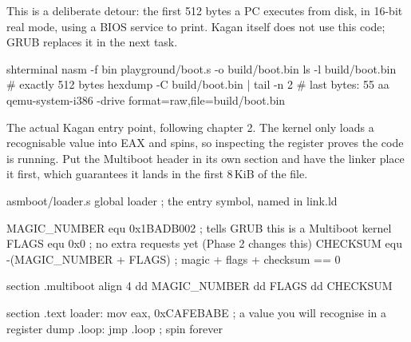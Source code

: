 \documentclass[11pt,a4paper]{article}
\begin{document}
This is a deliberate detour: the first 512 bytes a PC executes from disk, in 16-bit real mode, using a BIOS
service to print. Kagan itself does not use this code; GRUB replaces it in the next task.


\begin{lst}{sh}{terminal}
nasm -f bin playground/boot.s -o build/boot.bin
ls -l build/boot.bin             # exactly 512 bytes
hexdump -C build/boot.bin | tail -n 2   # last bytes: 55 aa
qemu-system-i386 -drive format=raw,file=build/boot.bin
\end{lst}

The actual Kagan entry point, following \LOB chapter 2. The kernel only loads a recognisable value into EAX and
spins, so inspecting the register proves the code is running. Put the Multiboot header in its own section
and have the linker place it first, which guarantees it lands in the first 8\,KiB of the file.

\begin{lst}{asm}{boot/loader.s}
global loader                   ; the entry symbol, named in link.ld

MAGIC_NUMBER equ 0x1BADB002     ; tells GRUB this is a Multiboot kernel
FLAGS        equ 0x0            ; no extra requests yet (Phase 2 changes this)
CHECKSUM     equ -(MAGIC_NUMBER + FLAGS)   ; magic + flags + checksum == 0

section .multiboot
align 4
    dd MAGIC_NUMBER
    dd FLAGS
    dd CHECKSUM

section .text
loader:
    mov eax, 0xCAFEBABE         ; a value you will recognise in a register dump
.loop:
    jmp .loop                   ; spin forever
\end{lst}
\end{document}
